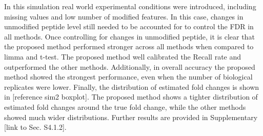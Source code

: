 \documentclass[mcp]{article}
\numberwithin{figure}{section} %
\numberwithin{table}{section}
\def\todo#1{{\color{red}[#1]}}
\begin{document}
In this simulation real world experimental conditions were introduced, including missing values and low number of modified features. In this case, changes in unmodified peptide level still needed to be accounted for to control the FDR in all methods. Once controlling for changes in unmodified peptide, it is clear that the proposed method performed stronger across all methods when compared to limma and t-test. The proposed method well calibrated the Recall rate and outperformed the other methods. Additionally, in overall accuracy the proposed method showed the strongest performance, even when the number of biological replicates were lower. Finally, the distribution of estimated fold changes is shown in \todo{reference sim2 boxplot}. The proposed method shows a tighter distribution of estimated fold changes around the true fold change, while the other methods showed much wider distributions. Further results are provided in Supplementary \todo{link to Sec. S4.1.2}. 


\end{document}
